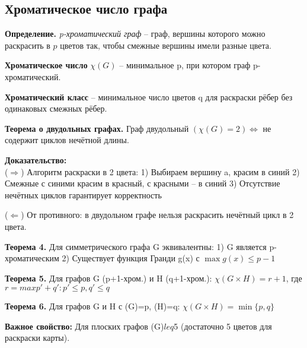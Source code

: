 \subsection{Хроматическое число графа}

\noindent\textbf{Определение.} \textit{p-хроматический граф} -- граф, вершины которого можно раскрасить в $p$ цветов так, чтобы смежные вершины имели разные цвета.

\noindent\textbf{Хроматическое число} $\chi(G)$ -- минимальное p, при котором граф p-хроматический.

\noindent\textbf{Хроматический класс} -- минимальное число цветов q для раскраски рёбер без одинаковых смежных рёбер.

\noindent\textbf{Теорема о двудольных графах.} Граф двудольный $(\chi(G)=2) \Longleftrightarrow$ не содержит циклов нечётной длины.

\noindent\textbf{Доказательство:}\\
($\Rightarrow$) Алгоритм раскраски в 2 цвета:
1) Выбираем вершину a, красим в синий
2) Смежные с синими красим в красный, с красными -- в синий
3) Отсутствие нечётных циклов гарантирует корректность
 
($\Leftarrow$) От противного: в двудольном графе нельзя раскрасить нечётный цикл в 2 цвета.

\noindent\textbf{Теорема 4.} Для симметрического графа G эквивалентны:
1) G является p-хроматическим
2) Существует функция Гранди g(x) с $\max g(x) \leq p-1$

\noindent\textbf{Теорема 5.} Для графов G (p+1-хром.) и H (q+1-хром.):
$\chi(G \times H) = r+1$, где $r = max{p'+q': p'\leq p, q'\leq q}$

\noindent\textbf{Теорема 6.} Для графов G и H с \chi(G)=p, \chi(H)=q:
$\chi(G \times H) = \min\{p,q\}$

\noindent\textbf{Важное свойство:} Для плоских графов \chi(G)$leq$5 (достаточно 5 цветов для раскраски карты).